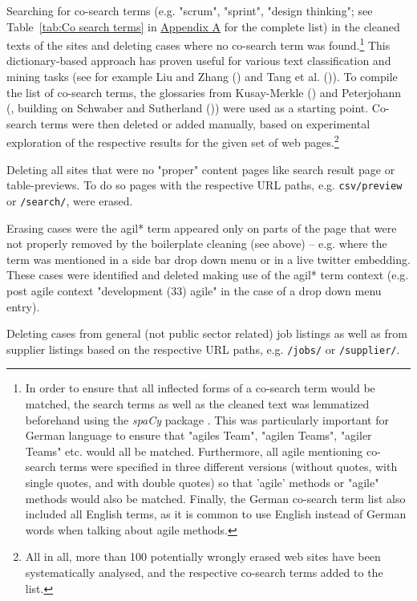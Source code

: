 \begin{compactitem}
\begin{compactitem}
    \item Searching for co-search terms (e.g. "scrum", "sprint", "design thinking"; see Table~\ref{tab:Co search terms} in \hyperref[Appendix A]{Appendix A} for the complete list) in the cleaned texts of the sites and deleting cases where no co-search term was found.\footnote{In order to ensure that all inflected forms of a co-search term would be matched, the search terms as well as the cleaned text was lemmatized beforehand using the \textit{spaCy} package \parencite{honnibal-johnson:2015:EMNLP}. This was particularly important for German language to ensure that "agiles Team", "agilen Teams", "agiler Teams" etc. would all be matched. Furthermore, all agile mentioning co-search terms were specified in three different versions (without quotes, with single quotes, and with double quotes) so that 'agile' methods or "agile" methods would also be matched. Finally, the German co-search term list also included all English terms, as it is common to use English instead of German words when talking about agile methods.} This dictionary-based approach has proven useful for various text classification and mining tasks (see for example Liu and Zhang (\cite*{Liu2012}) and  Tang et al. (\cite*{TANG2013})). To compile the list of co-search terms, the glossaries from Kusay-Merkle (\cite*{Kusay-Merkle2018}) and Peterjohann (\cite*{Peterjohann2020}, building on Schwaber  and  Sutherland (\cite*{Schwaber2020})) were used as a starting point. Co-search terms were then deleted or added manually, based on experimental exploration of the respective results for the given set of web pages.\footnote{All in all, more than 100 potentially wrongly erased web sites have been systematically analysed, and the respective co-search terms added to the list.} 
    \item Deleting all sites that were no "proper" content pages like search result page or table-previews. To do so pages with the respective URL paths, e.g. \texttt{csv/preview} or \texttt{/search/}, were erased.
    \item Erasing cases were the agil* term appeared only on parts of the page that were not properly removed by the boilerplate cleaning (see above) – e.g. where the term was mentioned in a side bar drop down menu or in a live twitter embedding. These cases were identified and deleted making use of the agil* term context (e.g. post agile context "development (33) agile" in the case of a drop down menu entry).
    \item Deleting cases from general (not public sector related) job listings as well as from supplier listings based on the respective URL paths, e.g. \texttt{/jobs/} or \texttt{/supplier/}.

\end{compactitem}
\end{compactitem}
